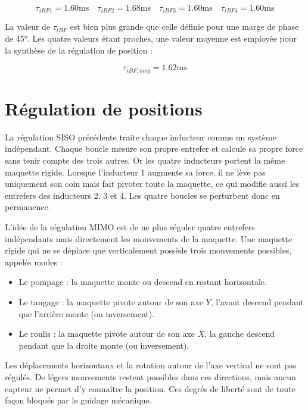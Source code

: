 \begin{equation*}
    \tau_{iBF1} = 1.60 \text{ms}\quad \tau_{iBF2} = 1.68 \text{ms} \quad \tau_{iBF3} = 1.60 \text{ms} \quad \tau_{iBF4} = 1.60 \text{ms}
\end{equation*}

La valeur de $\tau_{iBF}$ est bien plus grande que celle définie pour une marge de phase de 45°. Les quatre valeurs étant proches, une valeur moyenne est employée pour la synthèse de la régulation de position :

\begin{equation}
    \tau_{iBF,moy} = 1.62 \text{ms}
\end{equation}

\section{Régulation de positions}
\label{sec:RegPosMIMO}
La régulation SISO précédente traite chaque inducteur comme un système indépendant. Chaque boucle mesure son propre entrefer et calcule sa propre force sans tenir compte des trois autres. Or les quatre inducteurs portent la même maquette rigide. Lorsque l'inducteur 1 augmente sa force, il ne lève pas uniquement son coin mais fait pivoter toute la maquette, ce qui modifie aussi les entrefers des inducteurs 2, 3 et 4. Les quatre boucles se perturbent donc en permanence.

L'idée de la régulation MIMO est de ne plus réguler quatre entrefers indépendants mais directement les mouvements de la maquette. Une maquette rigide qui ne se déplace que verticalement possède trois mouvements possibles, appelés modes :

\begin{itemize}
    \item Le pompage : la maquette monte ou descend en restant horizontale.
    \item Le tangage : la maquette pivote autour de son axe $Y$, l'avant descend pendant que l'arrière monte (ou inversement).
    \item Le roulis : la maquette pivote autour de son axe $X$, la gauche descend pendant que la droite monte (ou inversement).
\end{itemize}

Les déplacements horizontaux et la rotation autour de l'axe vertical ne sont pas régulés. De légers mouvements restent possibles dans ces directions, mais aucun capteur ne permet d'y connaître la position. Ces degrés de liberté sont de toute façon bloqués par le guidage mécanique.

